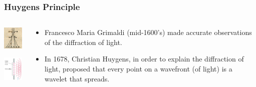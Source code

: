 \documentclass{beamer}
\begin{document}
\begin{frame}\frametitle{Huygens Principle}
\begin{columns}
\begin{column}{3cm}
\begin{center}
\includegraphics[width=2cm]{fig/grimaldi.png}

\vspace{0.5cm}

\includegraphics[width=2cm]{fig/huygens.png}

\end{center}
\end{column}

\begin{column}{8cm}
\begin{itemize}
\item Francesco Maria Grimaldi (mid-1600's) made accurate observations of the diffraction of light.

\vspace{0.5cm}

\item In 1678, Christian Huygens, in order to explain the diffraction of light, proposed that every point on a wavefront (of light) is a wavelet that spreads.
\end{itemize}
\end{column}
\end{columns}

\end{frame}
\end{document}
